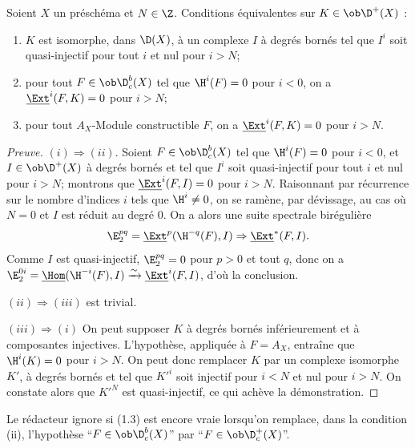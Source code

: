 \begin{proposition}[Cf.~{\upshape [H]~1.7.6}]
Soient $X$ un préschéma et $N \in \Z$. Conditions équivalentes sur $K \in \ob \D^{+}(X)$ :
\begin{enumerate}
\item[(i)] $K$ est isomorphe, dans $\D(X)$, à un complexe $I$ à degrés bornés tel que $I^i$ soit quasi-injectif pour tout $i$ et nul pour $i > N$;
\item[(ii)] pour tout $F \in \ob \D_c^{b}(X)$ tel que $\H^i(F) = 0$ pour $i < 0$, on a $\underline{\Ext}^i(F,K) = 0$ pour $i > N$;
\item[(iii)] pour tout $A_X$-Module constructible $F$, on a $\underline{\Ext}^i(F,K) = 0$ pour $i > N$.
\end{enumerate}
\end{proposition}

\begin{proof}[Preuve]
$(i) \Rightarrow (ii)$. Soient $F \in \ob \D_c^{b}(X)$ tel que $\H^i(F) = 0$ pour $i < 0$, et $I \in \ob \D^{+}(X)$ à degrés bornés et tel que $I^i$ soit quasi-injectif pour tout $i$ et nul pour $i > N$; montrons que $\underline{\Ext}^i(F,I) = 0$ pour $i > N$. Raisonnant par récurrence sur le nombre d'indices $i$ tels que $\H^i \neq 0$, on se ramène, par dévissage, au cas où $N = 0$ et $I$ est réduit au degré $0$. On a alors une suite spectrale birégulière
\[
\E_2^{pq} = \underline{\Ext}^p(\H^{-q}(F),I) \Rightarrow \underline{\Ext}^{*}(F,I).
\]
Comme $I$ est quasi-injectif, $\E_2^{pq} = 0$ pour $p > 0$ et tout $q$, donc on a $\E_2^{0i} = \underline{\Hom}(\H^{-i}(F),I) \xrightarrow{\sim} \underline{\Ext}^i(F,I)$, d'où la conclusion.

$(ii) \Rightarrow (iii)$ est trivial.

$(iii) \Rightarrow (i)$ On peut supposer $K$ à degrés bornés inférieurement et à composantes injectives. L'hypothèse, appliquée à $F = A_X$, entraîne que $\H^i(K) = 0$ pour $i > N$. On peut donc remplacer $K$ par un complexe isomorphe $K'$, à degrés bornés et tel que $K'^i$ soit injectif pour $i < N$ et nul pour $i > N$. On constate alors que $K'^N$ est quasi-injectif, ce qui achève la démonstration.
\end{proof}

\begin{remark}
Le rédacteur ignore si (1.3) est encore vraie lorsqu'on remplace, dans la condition (ii), l'hypothèse ``$F \in \ob \D_c^{b}(X)$'' par ``$F \in \ob \D_c^{+}(X)$''.
\end{remark}

